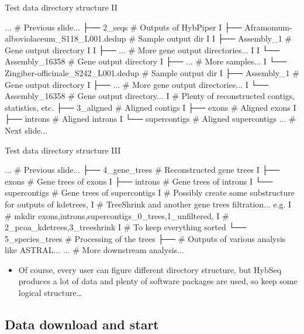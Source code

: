 \documentclass[compress,  xelatex, 11pt, xcolor=x11names, aspectratio=169,
	hyperref={
		bookmarks=true,
		unicode=true,
		colorlinks=true,
		pdftitle={HybSeq course},
		plainpages=false,
		pdfauthor={Vojtech Zeisek},
		pdfsubject={Practical processing of HybSeq target enrichment sequencing data on computing grids like MetaCentrum},
		pdfcreator={XeLaTeX},
		pdfkeywords={BASH, command line, GNU, HybSeq, Linux, MetaCentrum, sequencing shell, target enrichment},
		linkcolor=Turquoise4, %
		anchorcolor=DodgerBlue4, %
		citecolor=DodgerBlue4, %
		filecolor=DodgerBlue4, %
		menucolor=Tan4, %
		urlcolor=DarkOliveGreen4 %
		},
	url={hyphens, lowtilde} %
	]{beamer}
\begin{document}
\begin{frame}[fragile]{Test data directory structure II}
	\begin{bashcode}
        ... # Previous slide...
        ├── 2_seqs # Outputs of HybPiper
        I   ├── Aframomum-alboviolaceum_S118_L001.dedup # Sample output dir
        I   I   ├── Assembly_1 # Gene output directory
        I   I   ├── ... # More gene output directories...
        I   I   └── Assembly_16358 # Gene output directory
        I   ├── ... # More samples...
        I   └── Zingiber-officinale_S242_L001.dedup # Sample output dir
        I       ├── Assembly_1 # Gene output directory
        I       ├── ... # More gene output directories...
        I       └── Assembly_16358 # Gene output directory...
        I    # Plenty of reconstructed contigs, statistics, etc.
        ├── 3_aligned # Aligned contigs
        I   ├── exons # Aligned exons
        I   ├── introns # Aligned introns
        I   └── supercontigs # Aligned supercontigs
        ... # Next slide...
	\end{bashcode}
\end{frame}

\begin{frame}[fragile]{Test data directory structure III}
	\begin{bashcode}
        ... # Previous slide...
        ├── 4_gene_trees # Reconstructed gene trees
        I   ├── exons # Gene trees of exons
        I   ├── introns # Gene trees of introns
        I   └── supercontigs # Gene trees of supercontigs
        I   # Possibly create some substructure for outputs of kdetrees,
        I   # TreeShrink and another gene trees filtration... e.g.
        I   # mkdir {exons,introns,supercontigs}_{0_trees,1_unfiltered,
        I   #   2_pcoa_kdetrees,3_treeshrink}
        I   # To keep everything sorted
        └── 5_species_trees # Processing of the trees
            ├── # Outputs of various analysis like ASTRAL...
            ... # More downstream analysis...
	\end{bashcode}
	\begin{itemize}
		\item Of course, every user can figure different directory structure, but HybSeq produces a lot of data and plenty of software packages are used, so keep some logical structure\ldots
	\end{itemize}
\end{frame}

\subsection{Data download and start}
\end{document}
